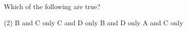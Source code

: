 \item Which of the following are true?
    \begin{tasks}(2)
        \task B and C only
        \task C and D only
        \task B and D only
        \task A and C only
    \end{tasks}